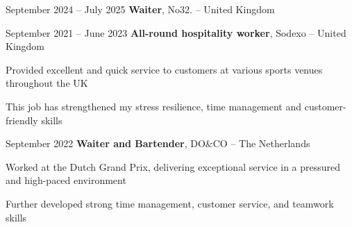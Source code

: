 	\begin{twocolentry}{
			September 2024 – July 2025
		}
		\textbf{Waiter}, No32. -- United Kingdom\end{twocolentry}
	
	\vspace{0.10 cm}
	\begin{onecolentry}
		\begin{highlights}
			\item 
			\item 
			\item 
		\end{highlights}
	\end{onecolentry}
	
	\vspace{0.2 cm}
	
	\begin{twocolentry}{
			September 2021 – June 2023
		}
		\textbf{All-round hospitality worker}, Sodexo -- United Kingdom
	\end{twocolentry}
	
	\vspace{0.10 cm}
	\begin{onecolentry}
		\begin{highlights}
			\item Provided excellent and quick service to customers at various sports venues throughout the UK
			\item This job has strengthened my stress resilience, time management and customer-friendly skills
		\end{highlights}
	\end{onecolentry}
	
	\vspace{0.2 cm}
	
	\begin{twocolentry}{
			September 2022
		}
		\textbf{Waiter and Bartender}, DO\&CO -- The Netherlands\end{twocolentry}
	
	\vspace{0.10 cm}
	\begin{onecolentry}
		\begin{highlights}
			\item Worked at the Dutch Grand Prix, delivering exceptional service in a pressured and high-paced environment
			\item Further developed strong time management, customer service, and teamwork skills
		\end{highlights}
	\end{onecolentry}
	
